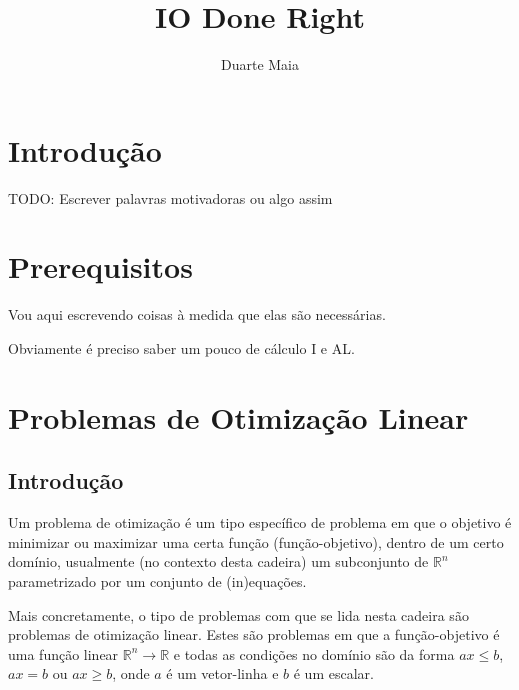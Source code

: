 \documentclass{article}
\title{IO Done Right}
\author{Duarte Maia}
\date{}
\newcommand{\R}{\mathbb{R}}
\theoremstyle{definition}
\begin{document}
	\maketitle
	
	\tableofcontents
	
	\section{Introdução}
	
	TODO: Escrever palavras motivadoras ou algo assim
	
	\section{Prerequisitos}
	
	Vou aqui escrevendo coisas à medida que elas são necessárias.
	
	Obviamente é preciso saber um pouco de cálculo I e AL.
	
	\section{Problemas de Otimização Linear}
	
	\subsection{Introdução}
	
	Um problema de otimização é um tipo específico de problema em que o objetivo é minimizar ou maximizar uma certa função (função-objetivo), dentro de um certo domínio, usualmente (no contexto desta cadeira) um subconjunto de $\R^n$ parametrizado por um conjunto de (in)equações.
	
	Mais concretamente, o tipo de problemas com que se lida nesta cadeira são problemas de otimização linear. Estes são problemas em que a função-objetivo é uma função linear $\R^n \rightarrow \R$ e todas as condições no domínio são da forma $ax \leq b$, $ax = b$ ou $ax \geq b$, onde $a$ é um vetor-linha e $b$ é um escalar.
	
\end{document}
